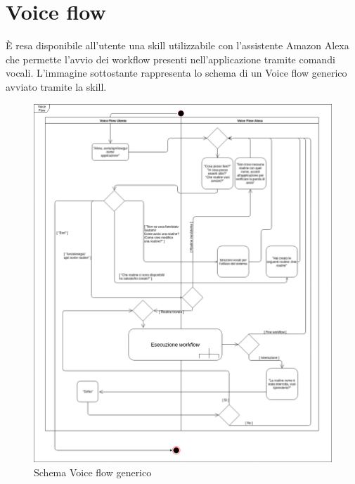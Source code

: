 \clearpage
\section{Voice flow}
\label{sec:voice_flow}
È resa disponibile all'utente una skill utilizzabile con l'assistente Amazon Alexa che permette l'avvio dei workflow presenti nell'applicazione tramite comandi vocali.
L'immagine sottostante rappresenta lo schema di un Voice flow generico avviato tramite la skill.
\begin{figure}[H]
	\centering
	\includegraphics[width=15cm,keepaspectratio]{../includes/pics/voice_flow_alexa-utente_UML.png}
	\caption{\label{fig:mission}Schema Voice flow generico}
\end{figure}
